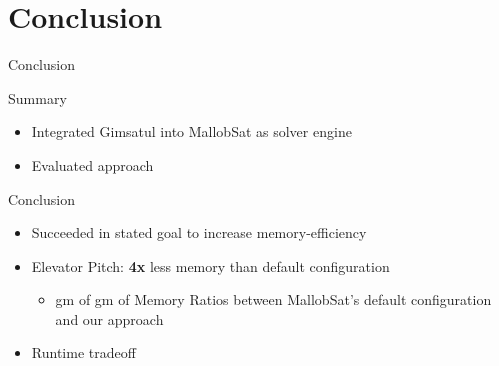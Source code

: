 \documentclass{beamer}
\begin{document}

\section{Conclusion}
\begin{frame}{Conclusion}
    \begin{block}{Summary}
        \begin{itemize}
            \item Integrated Gimsatul into MallobSat as solver engine
            \item Evaluated approach
        \end{itemize}
    \end{block}

    \begin{block}{Conclusion}
        \begin{itemize}
            \item Succeeded in stated goal to increase memory-efficiency
            \item Elevator Pitch: \textbf{4x} less memory than default configuration
            \begin{itemize}
                \item gm of gm of Memory Ratios between MallobSat's default configuration and our approach
            \end{itemize}
            \item Runtime tradeoff
        \end{itemize}
    \end{block}
\end{frame}
\end{document}
